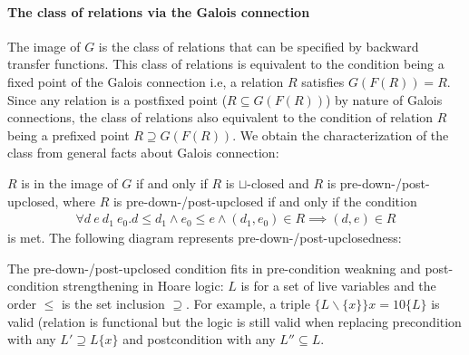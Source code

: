 \documentclass{llncs}
\newcommand{\join}{\sqcup}
\newcommand{\rotleq}{\rotatebox[origin=c]{90}{$\leq$}}
\begin{document}
\paragraph{The class of relations via the Galois connection}
  The image of $G$ is the class of relations that can be specified by backward transfer functions.
  This class of relations is equivalent to the condition being a fixed point of the Galois connection i.e, a relation $R$ satisfies $G(F(R)) = R$. Since any relation is a postfixed point ($R \subseteq G(F(R))$) by nature of Galois connections, the class of relations also equivalent to the condition of relation $R$ being a prefixed point $R \supseteq G(F(R))$.
  We obtain the characterization of the class from general facts about Galois connection:
  \begin{proposition}\label{prop:predown-postup}
  $R$ is in the image of $G$ if and only if $R$ is $\join$-closed and $R$ is pre-down-/post-upclosed,
  where $R$ is pre-down-/post-upclosed if and only if the condition
  \begin{align*}
  \forall d\ e\ d_{1 }\ e_{0}. d \leq d_{1} \land e_{0} \leq e \land (d_{1}, e_{0}) \in R \implies (d, e) \in R
  \end{align*}
  is met.
  The following diagram represents pre-down-/post-upclosedness:
  \begin{center}
  \end{center}
  \end{proposition}


  \begin{example}
    The pre-down-/post-upclosed condition fits in pre-condition weakning and post-condition strengthening in Hoare logic: $L$ is for a set of live variables and the order $\leq$ is the set inclusion $\supseteq$.
    For example, a triple $\{ L \backslash \{ x \} \} x = 10 \{ L \}$ is valid (relation is functional but the logic is still valid when replacing precondition with any $L' \supseteq L \{ x \}$ and postcondition with any $L'' \subseteq L$.
  \end{example}
\end{document}
